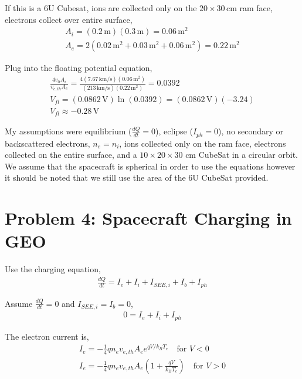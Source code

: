 \documentclass[11pt]{article}
\begin{document}
\hspace*{2em}If this is a 6U Cubesat, ions are collected
only on the $20 \times 30\,\mathrm{cm}$ ram face, electrons collect over entire surface,
\begin{gather*}
A_i = (0.2\,\mathrm{m})(0.3\,\mathrm{m}) = 0.06\,\mathrm{m^2} \\
A_e = 2(0.02\,\mathrm{m^2} + 0.03\,\mathrm{m^2} + 0.06\,\mathrm{m^2}) = 0.22\,\mathrm{m^2}
\end{gather*}

\hspace*{2em}Plug into the floating potential equation,
\begin{gather*}
\frac{4 v_0 A_i}{v_{e,th} A_e} = \frac{4(7.67\,\mathrm{km/s})(0.06\,\mathrm{m^2})}{(213\,\mathrm{km/s})(0.22\,\mathrm{m^2})} = 0.0392 \\
V_{fl} = (0.0862\,\mathrm{V})\ln(0.0392) = (0.0862\,\mathrm{V})(-3.24) \\
\boxed{V_{fl} \approx -0.28\,\mathrm{V}}
\end{gather*}

\hspace*{2em}My assumptions were equilibrium ($\frac{dQ}{dt} = 0$), eclipse ($I_{ph} = 0$), no secondary or backscattered
electrons, $n_e = n_i$, ions collected only on the ram face, electrons collected on the entire surface, and a
$10 \times 20 \times 30$ cm CubeSat in a circular orbit. We assume that the spacecraft is spherical in order to use the equations however
it should be noted that we still use the area of the 6U CubeSat provided. 

\newpage
\section*{Problem 4: Spacecraft Charging in GEO}
\hspace*{2em}Use the charging equation,
\begin{gather*}
\frac{dQ}{dt} = I_e + I_i + I_{SEE,i} + I_b + I_{ph}
\end{gather*}

\hspace*{2em}Assume $\frac{dQ}{dt} = 0$ and $I_{SEE,i} = I_b = 0$,
\begin{gather*}
0 = I_e + I_i + I_{ph}
\end{gather*}

\hspace*{2em}The electron current is,
\begin{gather*}
I_e = -\frac{1}{4} q n_e v_{e,th} A_e e^{qV/k_B T_e} \quad \text{for } V < 0 \\
I_e = -\frac{1}{4} q n_e v_{e,th} A_e \left(1 + \frac{qV}{k_B T_e}\right) \quad \text{for } V > 0
\end{gather*}
\end{document}
